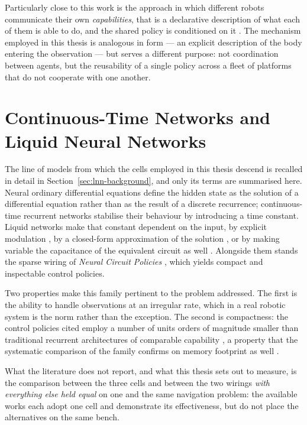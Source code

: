 Particularly close to this work is the approach in which different robots
communicate their own \emph{capabilities}, that is a declarative description of
what each of them is able to do, and the shared policy is conditioned on it
\cite{howell2023capabilities}. The mechanism employed in this thesis is
analogous in form --- an explicit description of the body entering the
observation --- but serves a different purpose: not coordination between agents,
but the reusability of a single policy across a fleet of platforms that do not
cooperate with one another.

\section{Continuous-Time Networks and Liquid Neural Networks}
\label{sec:rel-lnn}

The line of models from which the cells employed in this thesis descend is
recalled in detail in Section~\ref{sec:lnn-background}, and only its terms are
summarised here. Neural ordinary differential equations \cite{chen2018neuralode}
define the hidden state as the solution of a differential equation rather than
as the result of a discrete recurrence; continuous-time recurrent networks
\cite{funahashi1993ctrnn} stabilise their behaviour by introducing a time
constant. Liquid networks make that constant dependent on the input, by explicit
modulation \cite{hasani2021ltc}, by a closed-form approximation of the solution
\cite{hasani2022cfc}, or by making variable the capacitance of the equivalent
circuit as well \cite{farsang2024lrc}. Alongside them stands the sparse wiring
of \emph{Neural Circuit Policies} \cite{lechner2020ncp}, which yields compact
and inspectable control policies.

Two properties make this family pertinent to the problem addressed. The first is
the ability to handle observations at an irregular rate, which in a real robotic
system is the norm rather than the exception. The second is compactness: the
control policies cited employ a number of units orders of magnitude smaller than
traditional recurrent architectures of comparable capability
\cite{lechner2020ncp}, a property that the systematic comparison of the family
confirms on memory footprint as well \cite{zong2025lnnsurvey}.

What the literature does not report, and what this thesis sets out to measure,
is the comparison between the three cells and between the two wirings
\emph{with everything else held equal} on one and the same navigation problem:
the available works each adopt one cell and demonstrate its effectiveness, but
do not place the alternatives on the same bench.

